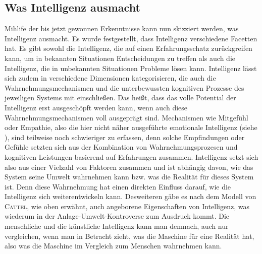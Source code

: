 \documentclass[a4paper, 11pt]{scrartcl}
\begin{document}
\subsection{Was Intelligenz ausmacht}
Mihlife der bis jetzt gewonnen Erkenntnisse kann nun skizziert werden, was Intelligenz ausmacht. Es wurde festgestellt, dass Intelligenz verschiedene Facetten hat. Es gibt sowohl die Intelligenz, die auf einen Erfahrungsschatz zurückgreifen kann, um in bekannten Situationen Entscheidungen zu treffen als auch die Intelligenz, die in unbekannten Situationen Probleme lösen kann. Intelligenz lässt sich zudem in verschiedene Dimensionen kategorisieren, die auch die Wahrnehmungsmechanismen und die unterbewussten kognitiven Prozesse des jeweiligen Systems mit einschließen. Das heißt, dass das volle Potential der Intelligenz erst ausgeschöpft werden kann, wenn auch diese Wahrnehmungsmechanismen voll ausgeprägt sind. Mechanismen wie Mitgefühl oder Empathie, also die hier nicht näher ausgeführte emotionale Intelligenz (siehe \cite{Mayer1990}), sind teilweise noch schwieriger zu erfassen, denn solche Empfindungen oder Gefühle setzten sich aus der Kombination von Wahrnehmungsprozesen und kognitiven Leistungen basierend auf Erfahrungen zusammen. Intelligenz setzt sich also aus einer Vielzahl von Faktoren zusammen und ist abhängig davon, wie das System seine Umwelt wahrnehmen kann bzw. was die Realität für dieses System ist. Denn diese Wahrnehmung hat einen direkten Einfluss darauf, wie die Intelligenz sich weiterentwickeln kann. Desweiteren gäbe es nach dem Modell von \textsc{Cattel}, wie oben erwähnt, auch angeborene Eigenschaften von Intelligenz, was wiederum in der Anlage-Umwelt-Kontroverse zum Ausdruck kommt. Die menschliche und die künstliche Intelligenz kann man demnach, auch nur vergleichen, wenn man in Betracht zieht, was die Maschine für eine Realität hat, also was die Maschine im Vergleich zum Menschen wahrnehmen kann.
\end{document}
